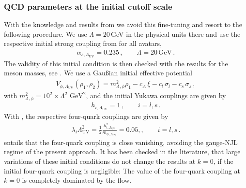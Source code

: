\documentclass[reprint,twocolumn,superscriptaddress,preprintnumbers,amsmath,amssymb,aps,prd,floatfix]{revtex4-2}
\begin{document}
\subsubsection{QCD parameters at the initial cutoff scale} 
\label{app:QCDparameters}

With the knowledge and results from  \cite{Fu:2019hdw, Ihssen:2024miv, Fu:2025hcm} we avoid this fine-tuning and resort to the following procedure. We use $\Lambda=20$\,GeV in the physical units there and use the respective initial strong coupling from \cite{Fu:2019hdw} for all avatars, 
%
\begin{align}
\alpha_{s,\Lambda_\textrm{UV}}=0.235\,, \qquad \Lambda=20\,\textrm{GeV}\,. 
\label{eq:alphaInitial}
\end{align}
% 
The validity of this initial condition is then checked with the results for the meson masses, see . We use a Gau\ss ian initial effective potential 
%
\begin{align}
 V_{\phi,\Lambda_\textrm{UV}}(\rho_1,\rho_2)= m_{\Lambda,\phi}^2  \rho_1 -c_A\,\xi-  c_l\,\sigma_l- c_s\,\sigma_s\,,
 \label{eq:InitialVphi}
\end{align}
%
with $m_{\Lambda,\phi}^2=10^2\times\Lambda^2$ $\mathrm{GeV}^{2}$, and the initial Yukawa couplings are given by 
%
\begin{align} 
	h_{i, \Lambda_\textrm{UV}}= 1\,,\qquad i=l,s\,.
\label{eq:InitialYukawas}
\end{align} 
%
With , the respective four-quark couplings are given by 
%
\begin{align} 
\lambda_i \Lambda_\textrm{UV}^2= \frac12 \frac{h_{i,\Lambda_\textrm{UV}}^2}{ m_{\phi,\Lambda_\textrm{UV}}}  = 0.05 ,,\qquad i=l,s\,.
\label{eq:Initial4Quark}
\end{align} 
%
 entails that the four-quark coupling is close vanishing, avoiding the gauge-NJL regime of the present approach. It has been checked in the literature, that large variations of these initial conditions do not change the results at $k=0$, if the initial four-quark coupling is negligible: The value of the four-quark coupling at $k=0$ is completely dominated by the flow.     
\end{document}
